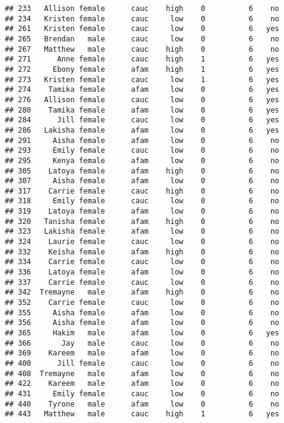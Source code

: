 \documentclass[
]{article}
\begin{document}
\begin{verbatim}
## 233   Allison female      cauc    high    0          6    no
## 234   Kristen female      cauc     low    0          6    no
## 261   Kristen female      cauc     low    0          6   yes
## 265   Brendan   male      cauc     low    0          6    no
## 267   Matthew   male      cauc    high    0          6    no
## 271      Anne female      cauc    high    1          6   yes
## 272     Ebony female      afam    high    1          6   yes
## 273   Kristen female      cauc     low    1          6   yes
## 274    Tamika female      afam     low    0          6   yes
## 276   Allison female      cauc     low    0          6   yes
## 280    Tamika female      afam     low    0          6   yes
## 284      Jill female      cauc     low    0          6   yes
## 286   Lakisha female      afam     low    0          6   yes
## 291     Aisha female      afam     low    0          6    no
## 293     Emily female      cauc     low    0          6    no
## 295     Kenya female      afam     low    0          6    no
## 305    Latoya female      afam    high    0          6    no
## 307     Aisha female      afam     low    0          6    no
## 317    Carrie female      cauc    high    0          6    no
## 318     Emily female      cauc     low    0          6    no
## 319    Latoya female      afam     low    0          6    no
## 320   Tanisha female      afam    high    0          6    no
## 323   Lakisha female      afam     low    0          6    no
## 324    Laurie female      cauc     low    0          6    no
## 332    Keisha female      afam    high    0          6    no
## 334    Carrie female      cauc     low    0          6    no
## 336    Latoya female      afam     low    0          6    no
## 337    Carrie female      cauc     low    0          6    no
## 342  Tremayne   male      afam    high    0          6    no
## 352    Carrie female      cauc     low    0          6    no
## 355     Aisha female      afam     low    0          6    no
## 356     Aisha female      afam     low    0          6    no
## 365     Hakim   male      afam     low    0          6   yes
## 366       Jay   male      cauc     low    0          6    no
## 369    Kareem   male      afam     low    0          6    no
## 400      Jill female      cauc     low    0          6    no
## 408  Tremayne   male      afam     low    0          6    no
## 422    Kareem   male      afam     low    0          6    no
## 431     Emily female      cauc     low    0          6    no
## 440    Tyrone   male      afam     low    0          6    no
## 443   Matthew   male      cauc    high    1          6   yes

\end{verbatim}
\end{document}
